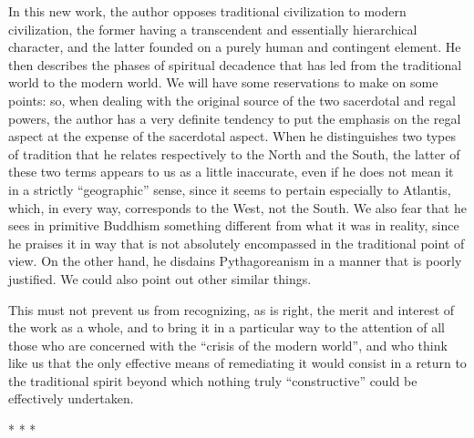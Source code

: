 \begin{quotex}
In this new work, the author opposes traditional civilization to modern civilization, the former having a transcendent and essentially hierarchical character, and the latter founded on a purely human and contingent element. He then describes the phases of spiritual decadence that has led from the traditional world to the modern world. We will have some reservations to make on some points: so, when dealing with the original source of the two sacerdotal and regal powers, the author has a very definite tendency to put the emphasis on the regal aspect at the expense of the sacerdotal aspect. When he distinguishes two types of tradition that he relates respectively to the North and the South, the latter of these two terms appears to us as a little inaccurate, even if he does not mean it in a strictly ``geographic'' sense, since it seems to pertain especially to Atlantis, which, in every way, corresponds to the West, not the South. We also fear that he sees in primitive Buddhism something different from what it was in reality, since he praises it in way that is not absolutely encompassed in the traditional point of view. On the other hand, he disdains Pythagoreanism in a manner that is poorly justified. We could also point out other similar things.

This must not prevent us from recognizing, as is right, the merit and interest of the work as a whole, and to bring it in a particular way to the attention of all those who are concerned with the ``crisis of the modern world'', and who think like us that the only effective means of remediating it would consist in a return to the traditional spirit beyond which nothing truly ``constructive'' could be effectively undertaken.
\end{quotex}




\begin{center}* * *\end{center}

